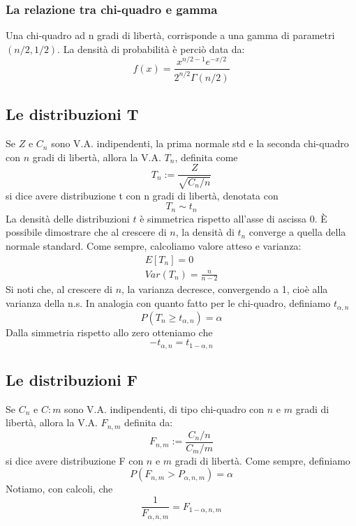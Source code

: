 \documentclass[11pt]{article}
\begin{document}
\subsubsection{La relazione tra chi-quadro e gamma}
Una chi-quadro ad n gradi di libertà, corrisponde a una gamma di parametri $(n/2, 1/2)$. La densità di probabilità è perciò data da:
\begin{displaymath}
    f(x) = \frac{x^{n/2-1}e^{-x/2}}{2^{n/2}\Gamma(n/2)}
\end{displaymath}
\subsection{Le distribuzioni T}
Se $Z$ e $C_n$ sono V.A. indipendenti, la prima normale std e la seconda chi-quadro con $n$ gradi di libertà, allora la V.A. $T_n$, definita come 
\begin{displaymath}
    T_n := \frac{Z}{\sqrt{C_n/n}}
\end{displaymath}
si dice avere distribuzione t con n gradi di libertà, denotata con
\begin{displaymath}
    T_n \sim t_n
\end{displaymath}
La densità delle distribuzioni $t$ è simmetrica rispetto all'asse di ascissa 0. È possibile dimostrare che al crescere di $n$, la densità di $t_n$ converge a quella della normale standard. 
Come sempre, calcoliamo valore atteso e varianza:
\begin{gather*}
    E[T_n] = 0\\ 
    Var(T_n) = \frac{n}{n-2}
\end{gather*}
Si noti che, al crescere di $n$, la varianza decresce, convergendo a 1, cioè alla varianza della n.s. In analogia con quanto fatto per le chi-quadro, definiamo $t_{\alpha,n}$
\begin{displaymath}
    P(T_n\ge t_{\alpha,n}) = \alpha
\end{displaymath}
Dalla simmetria rispetto allo zero otteniamo che
\begin{displaymath}
    -t_{\alpha,n} = t_{1-\alpha,n}
\end{displaymath}
\subsection{Le distribuzioni F}
Se $C_n$ e $C:m$ sono V.A. indipendenti, di tipo chi-quadro con $n$ e $m$ gradi di libertà, allora la V.A. $F_{n,m}$ definita da:
\begin{displaymath}
    F_{n,m} :=\frac{C_n/n}{C_m/m}
\end{displaymath}
si dice avere distribuzione F con $n$ e $m$ gradi di libertà. Come sempre, definiamo
\begin{displaymath}
    P(F_{n,m}>P_{\alpha,n,m}) = \alpha
\end{displaymath}
Notiamo, con calcoli, che
\begin{displaymath}
    \frac{1}{F_{\alpha,n,m}}=F_{1-\alpha,n,m}
\end{displaymath}
\end{document}
